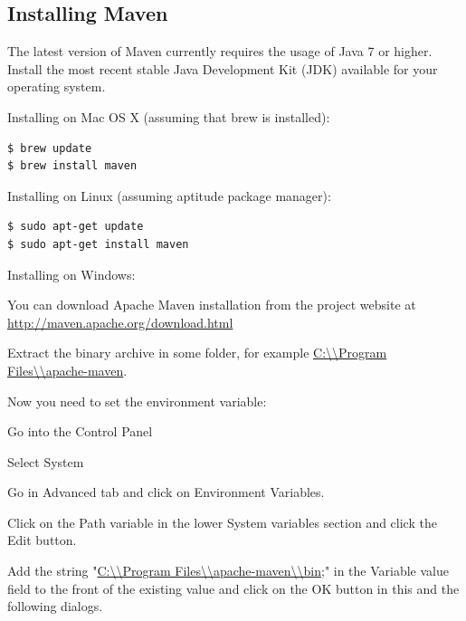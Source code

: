 \documentclass{article}
\begin{document}
\subsection{Installing Maven}

The latest version of Maven currently requires the usage of Java 7 or
higher. Install the most recent stable Java Development Kit (JDK)
available for your operating system.

\begin{description}
\item Installing on Mac OS X (assuming that brew is installed):
\begin{lstlisting}
$ brew update
$ brew install maven
\end{lstlisting}

\item Installing on Linux (assuming aptitude package manager):
\begin{lstlisting}
$ sudo apt-get update
$ sudo apt-get install maven
\end{lstlisting}

\item Installing on Windows:

You can download Apache Maven installation from the project website at
\url{http://maven.apache.org/download.html}

Extract the binary archive in some folder, for example \url{C:\\Program Files\\apache-maven}.

Now you need to set the environment variable:

\begin{compactitem}

\item Go into the Control Panel
\item Select System
\item Go in Advanced tab and click on Environment Variables.
\item Click on the Path variable in the lower System variables section and click the Edit button.
\item Add the string "\url{C:\\Program Files\\apache-maven\\bin;}" in the Variable value field to the front of the existing value and click on the OK button in this and the following dialogs.

\end{compactitem}

\end{description}
\end{document}
